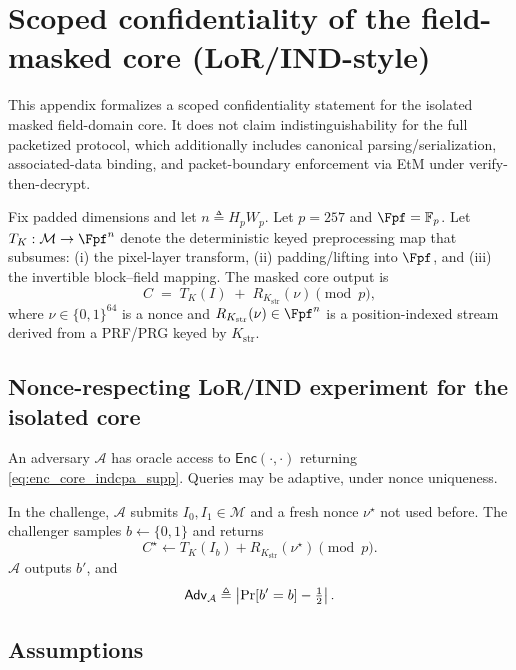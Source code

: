 \section{Scoped confidentiality of the field-masked core (LoR/IND-style)}
\label{snote:indcpa_proof}

This appendix formalizes a scoped confidentiality statement for the isolated masked field-domain core.
It does not claim indistinguishability for the full packetized protocol, which additionally includes
canonical parsing/serialization, associated-data binding, and packet-boundary enforcement via EtM
under verify-then-decrypt.

Fix padded dimensions and let $n \triangleq H_pW_p$. Let $p=257$ and $\Fpf=\mathbb{F}_p$.
Let $T_K:\mathcal{M}\rightarrow \Fpf^{n}$ denote the deterministic keyed preprocessing map that
subsumes: (i) the pixel-layer transform, (ii) padding/lifting into $\Fpf$, and (iii) the invertible
block--field mapping. The masked core output is
\begin{equation}
\label{eq:enc_core_indcpa_supp}
C \;=\; T_K(I)\;+\;R_{K_{\mathrm{str}}}(\nu)\pmod{p},
\end{equation}
where $\nu\in\{0,1\}^{64}$ is a nonce and $R_{K_{\mathrm{str}}}(\nu)\in\Fpf^{n}$ is a position-indexed
stream derived from a PRF/PRG keyed by $K_{\mathrm{str}}$.

\subsection{Nonce-respecting LoR/IND experiment for the isolated core}
\label{subsec:app_lor_exp}

An adversary $\mathcal{A}$ has oracle access to $\mathsf{Enc}(\cdot,\cdot)$ returning
\eqref{eq:enc_core_indcpa_supp}. Queries may be adaptive, under nonce uniqueness.

In the challenge, $\mathcal{A}$ submits $I_0,I_1\in\mathcal{M}$ and a fresh nonce $\nu^\star$ not used
before. The challenger samples $b\gets\{0,1\}$ and returns
\[
C^\star \gets T_K(I_b) + R_{K_{\mathrm{str}}}(\nu^\star)\pmod{p}.
\]
$\mathcal{A}$ outputs $b'$, and
\[
\mathsf{Adv}_{\mathcal{A}}
\triangleq
\left|\Pr[b'=b]-\tfrac{1}{2}\right|.
\]

\subsection{Assumptions}
\label{subsec:app_lor_assumptions}

